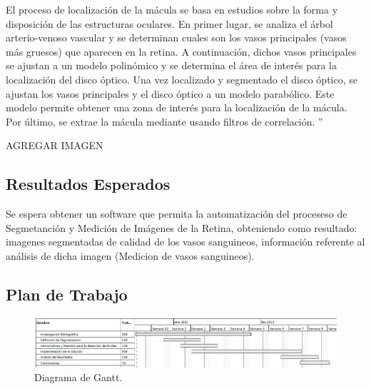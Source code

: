 \documentclass[14pt]{article}
\begin{document}
El proceso de localización de la mácula se basa en estudios sobre la forma y disposición de las estructuras oculares. En primer lugar, se analiza el árbol arterio-venoso vascular y se determinan cuales son los vasos principales (vasos más gruesos) que aparecen en la retina. A continuación, dichos vasos principales se ajustan a un modelo polinómico y se determina el área de interés para la localización del disco óptico. Una vez localizado y segmentado el disco óptico, se ajustan los vasos principales y el disco óptico a un modelo parabólico. Este modelo permite obtener una zona de interés para la localización de la mácula. Por último, se extrae la mácula mediante usando filtros de correlación. '' \cite{Sedaam}

AGREGAR IMAGEN






\subsection{Resultados Esperados}

Se espera obtener un software que permita la automatización del proceseso de Segmetanción y Medición de Imágenes de la Retina, obteniendo como resultado: imagenes segmentadas de calidad de los vasos sanguineos, información referente al análisis de dicha imagen (Medicion de vasos sanguineos).


\subsection{Plan de Trabajo}


\begin{figure}[h]
	\begin{center}
		\includegraphics[scale=.5]{./Imagenes/Gantt.jpg}
		\caption{Diagrama de Gantt.}
	\end{center}
\end{figure} 
\end{document}
